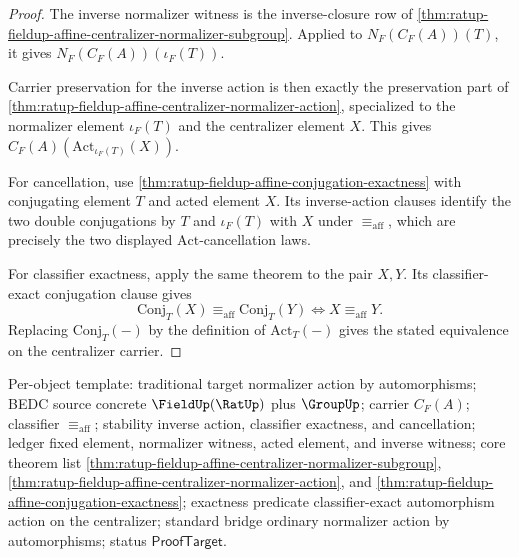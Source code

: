 \begin{proof}
The inverse normalizer witness is the inverse-closure row of
\autoref{thm:ratup-fieldup-affine-centralizer-normalizer-subgroup}. Applied to
$N_F(C_F(A))(T)$, it gives $N_F(C_F(A))(\iota_F(T))$.

Carrier preservation for the inverse action is then exactly the preservation
part of \autoref{thm:ratup-fieldup-affine-centralizer-normalizer-action},
specialized to the normalizer element $\iota_F(T)$ and the centralizer element
$X$. This gives $C_F(A)(\mathrm{Act}_{\iota_F(T)}(X))$.

For cancellation, use
\autoref{thm:ratup-fieldup-affine-conjugation-exactness} with conjugating
element $T$ and acted element $X$. Its inverse-action clauses identify the two
double conjugations by $T$ and $\iota_F(T)$ with $X$ under
$\equiv_{\mathrm{aff}}$, which are precisely the two displayed
$\mathrm{Act}$-cancellation laws.

For classifier exactness, apply the same theorem to the pair $X,Y$. Its
classifier-exact conjugation clause gives
$$
\mathrm{Conj}_T(X)\equiv_{\mathrm{aff}}\mathrm{Conj}_T(Y)
\Longleftrightarrow X\equiv_{\mathrm{aff}}Y.
$$
Replacing $\mathrm{Conj}_T(-)$ by the definition of $\mathrm{Act}_T(-)$ gives
the stated equivalence on the centralizer carrier.
\end{proof}

Per-object template: traditional target normalizer action by automorphisms;
BEDC source concrete $\FieldUp(\RatUp)$ plus $\GroupUp$; carrier $C_F(A)$;
classifier $\equiv_{\mathrm{aff}}$; stability inverse action, classifier
exactness, and cancellation; ledger fixed element, normalizer witness, acted
element, and inverse witness; core theorem list
\autoref{thm:ratup-fieldup-affine-centralizer-normalizer-subgroup},
\autoref{thm:ratup-fieldup-affine-centralizer-normalizer-action}, and
\autoref{thm:ratup-fieldup-affine-conjugation-exactness}; exactness predicate
classifier-exact automorphism action on the centralizer; standard bridge
ordinary normalizer action by automorphisms; status $\mathsf{ProofTarget}$.

